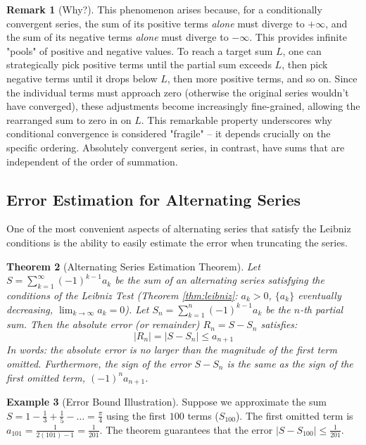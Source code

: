 \documentclass[11pt, a4paper]{article}
\theoremstyle{plain} %
\newtheorem{theorem}{Theorem}[section]
\theoremstyle{definition} %
\newtheorem{example}[theorem]{Example}
\newtheorem{remark}[theorem]{Remark}
\begin{document}
\begin{remark}[Why?]
This phenomenon arises because, for a conditionally convergent series, the sum of its positive terms \textit{alone} must diverge to $+\infty$, and the sum of its negative terms \textit{alone} must diverge to $-\infty$. This provides infinite "pools" of positive and negative values. To reach a target sum $L$, one can strategically pick positive terms until the partial sum exceeds $L$, then pick negative terms until it drops below $L$, then more positive terms, and so on. Since the individual terms must approach zero (otherwise the original series wouldn't have converged), these adjustments become increasingly fine-grained, allowing the rearranged sum to zero in on $L$. This remarkable property underscores why conditional convergence is considered "fragile" – it depends crucially on the specific ordering. Absolutely convergent series, in contrast, have sums that are independent of the order of summation.
\end{remark}

\subsection{Error Estimation for Alternating Series}
One of the most convenient aspects of alternating series that satisfy the Leibniz conditions is the ability to easily estimate the error when truncating the series.

\begin{theorem}[Alternating Series Estimation Theorem]\label{thm:alt_series_error}
Let $S = \sum_{k=1}^{\infty} (-1)^{k-1} a_k$ be the sum of an alternating series satisfying the conditions of the Leibniz Test (Theorem \ref{thm:leibniz}: $a_k > 0$, $\{a_k\}$ eventually decreasing, $\lim_{k \to \infty} a_k = 0$). Let $S_n = \sum_{k=1}^{n} (-1)^{k-1} a_k$ be the $n$-th partial sum. Then the absolute error (or remainder) $R_n = S - S_n$ satisfies:
$$ |R_n| = |S - S_n| \le a_{n+1} $$
In words: the absolute error is no larger than the magnitude of the first term omitted.
Furthermore, the sign of the error $S-S_n$ is the same as the sign of the first omitted term, $(-1)^n a_{n+1}$.
\end{theorem}

\begin{example}[Error Bound Illustration]
Suppose we approximate the sum $S = 1 - \frac{1}{3} + \frac{1}{5} - \dots = \frac{\pi}{4}$ using the first $100$ terms ($S_{100}$). The first omitted term is $a_{101} = \frac{1}{2(101)-1} = \frac{1}{201}$. The theorem guarantees that the error $|S - S_{100}| \le \frac{1}{201}$.
\end{example}
\end{document}
